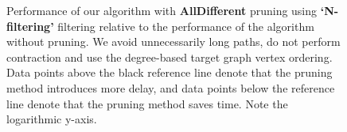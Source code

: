 \begin{figure}
\begin{subfigure} {0.5\linewidth}

\end{subfigure}

\caption{Performance of our algorithm with \textbf{AllDifferent} pruning using \textbf{`N-filtering'} filtering relative to the performance of the algorithm without pruning. We avoid unnecessarily long paths, do not perform contraction and use the degree-based target graph vertex ordering. Data points above the black reference line denote that the pruning method introduces more delay, and data points below the reference line denote that the pruning method saves time. Note the logarithmic y-axis.}		
\label{fig:alldifferentNfiltering}
\end{figure}
